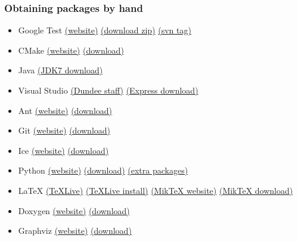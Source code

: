 \documentclass{beamer}
\begin{document}
\begin{frame}
  \frametitle{Obtaining packages by hand}
  \scriptsize
  \begin{itemize}
  \item Google Test \dotfill \href{https://code.google.com/p/googletest/}{(website)} \href{https://code.google.com/p/googletest/downloads/detail?name=gtest-1.7.0.zip}{(download zip)} \href{http://googletest.googlecode.com/svn/tags/release-1.7.0}{(svn tag)}
  \item CMake \dotfill \href{http://cmake.org/}{(website)} \href{http://cmake.org/cmake/resources/software.html}{(download)}
  \item Java \dotfill \href{http://www.oracle.com/technetwork/java/javase/downloads/jdk7-downloads-1880260.html}{(JDK7 download)}
  \item Visual Studio \dotfill \href{https://my.dundee.ac.uk/webapps/blackboard/content/listContent.jsp?course\_id=\_28436\_1\&content_id=\_3952234\_1}{(Dundee staff)} \href{http://www.visualstudio.com/downloads/download-visual-studio-vs\#d-express-windows-desktop}{(Express download)}
  \item Ant \dotfill \href{http://ant.apache.org/}{(website)} \href{http://ant.apache.org/bindownload.cgi}{(download)}
  \item Git \dotfill \href{http://www.git-scm.com/}{(website)} \href{http://www.git-scm.com/downloads}{(download)}
  \item Ice \dotfill \href{http://zeroc.com/}{(website)} \href{http://zeroc.com/download.html\#win32\_msi}{(download)}
  \item Python \dotfill \href{https://www.python.org/}{(website)} \href{https://www.python.org/download/releases/2.7.8/}{(download)} \href{http://www.lfd.uci.edu/\~gohlke/pythonlibs/}{(extra packages)}
  \item \LaTeX{} \dotfill \href{https://www.tug.org/texlive/}{(\TeX{}Live)} \href{https://www.tug.org/texlive/quickinstall.html}{(\TeX{}Live install)} \href{http://www.miktex.org/}{(Mik\TeX{} website)} \href{http://www.miktex.org/download}{(Mik\TeX{} download)}
  \item Doxygen \dotfill \href{http://www.stack.nl/\~dimitri/doxygen/}{(website)} \href{http://www.stack.nl/\~dimitri/doxygen/download.html}{(download)}
  \item Graphviz \dotfill \href{http://graphviz.org/}{(website)} \href{http://graphviz.org/Download\_windows.php}{(download)}
  \end{itemize}
\end{frame}
\end{document}
